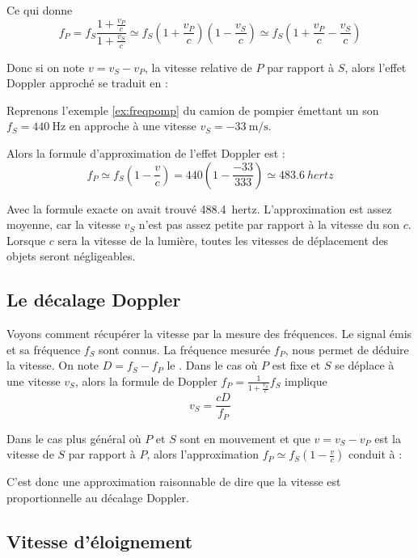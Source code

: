 \documentclass[class=report,crop=false]{standalone}
\begin{document}
Ce qui donne 
$$f_P = f_S \frac{1+\frac{v_P}{c}}{1+\frac{v_S}{c}}
\simeq f_S \left(1+\frac{v_P}{c}\right)\left(1-\frac{v_S}{c}\right)
\simeq f_S \left(1+\frac{v_P}{c}-\frac{v_S}{c}\right)$$

Donc si on note $v=v_S-v_P$, la vitesse relative de $P$ par rapport à $S$, alors
l'effet Doppler approché se traduit en :


\begin{exemple}
Reprenons l'exemple \ref{ex:freqpomp} du camion de pompier
émettant un son $f_S = \SI{440}{\hertz}$ en approche à une vitesse
$v_S = -\SI{33}{\meter\per\second}$.

Alors la formule d'approximation de l'effet Doppler est :
$$f_P \simeq f_S \left(1-\frac{v}{c}\right)
= 440 \left(1-\frac{-33}{333}\right)
\simeq \SI{483,6}{hertz}$$

Avec la formule exacte on avait trouvé \SI{488,4}{hertz}.
L'approximation est assez moyenne, car la vitesse $v_S$ n'est 
pas assez petite par rapport à la vitesse du son $c$.
Lorsque $c$ sera la vitesse de la lumière, toutes les vitesses
de déplacement des objets seront négligeables.
\end{exemple}

\subsection{Le décalage Doppler}

Voyons comment récupérer la vitesse par la mesure des fréquences.
Le signal émis et sa fréquence $f_S$ sont connus.
La fréquence mesurée $f_P$, nous permet de déduire la vitesse.
On note $D = f_S-f_P$ le .
Dans le cas où $P$ est fixe et $S$ se déplace à une vitesse $v_S$, alors
la formule de Doppler 
$f_P = \frac{1}{1+\frac{v_S}{c}} f_S$
implique 
$$v_S = \frac{c D}{f_P}$$


Dans le cas plus général où $P$ et $S$ sont en mouvement et que
$v = v_S-v_P$ est la vitesse de $S$ par rapport à $P$, alors l'approximation 
$f_P \simeq f_S \left(1-\frac{v}{c}\right)$
conduit à :

C'est donc une approximation raisonnable de dire que la 
vitesse est proportionnelle au décalage Doppler.


\subsection{Vitesse d'éloignement}
\end{document}
